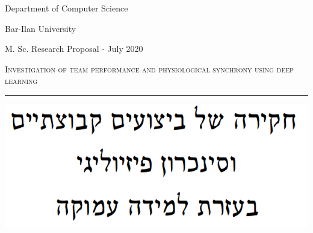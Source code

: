 \documentclass[a4paper, 11pt]{report}      %
\begin{document}
\begin{titlepage} %
	
	{\centering %
	
	
		\vspace{0.05\textheight} %
	
	\huge{Department of Computer Science
	
	Bar-Ilan University
	
	\vspace{30pt}}
	\Large{
	M. Sc. Research Proposal - July 2020
	}
	\vspace{15pt}
	
	
{\renewcommand{\baselinestretch}{1.8}\selectfont
    {\Huge \textsc{Investigation of team performance 
and physiological synchrony
using deep learning}} %
\par}

	
	\vspace{0.025\textheight} %
	
	\rule{0.3\textwidth}{0.4pt} %
	\includegraphics[scale=0.5]{hebrew_title.png}
	
}
\end{titlepage}
\end{document}
